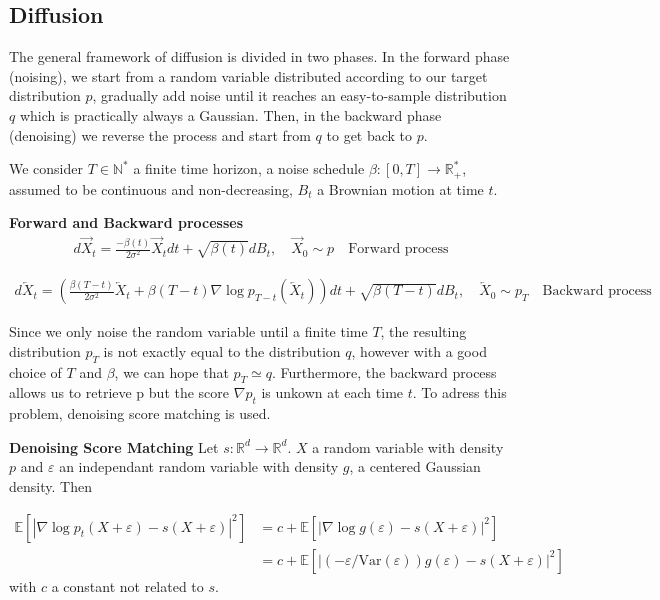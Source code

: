 \documentclass{article}
\begin{document}
\subsection{Diffusion}
The general framework of diffusion is divided in two phases. In the forward phase (noising), we start from a random variable distributed according to our target distribution \( p \), gradually add noise until it reaches an easy-to-sample distribution \(q\) which is practically always a Gaussian. Then, in the backward phase (denoising) we reverse the process and start from \(q\) to get back to \(p\). 

\bigskip

We consider \(T\in\mathbb{N}^{*}\) a finite time horizon, a noise schedule \(\beta:[0,T]\rightarrow \mathbb{R}_{+}^{*}\), assumed to be continuous and non-decreasing, \(B_t\) a Brownian motion at time \(t\).

\textbf{Forward and Backward processes}
\begin{align}
    d\overrightarrow{X}_t = \frac{-\beta(t)}{2\sigma^2}\overrightarrow{X}_t dt + \sqrt{\beta(t)}dB_t, \quad \overrightarrow{X}_0\sim p 
    \quad \text{Forward process}
\end{align} 

\begin{align}
    d\overleftarrow{X}_t=\left(  \frac{\beta(T-t)}{2\sigma^2}\overleftarrow{X}_t+\beta(T-t)\nabla\log p_{T-t}\left(\overleftarrow{X}_t \right)  \right)dt + \sqrt{\beta(T-t)}dB_t, \quad \overleftarrow{X}_0\sim p_T \quad \text{Backward process}
\end{align}

Since we only noise the random variable until a finite time \(T\), the resulting distribution \(p_T\) is not exactly equal to the distribution \(q\), however with a good choice of \(T\) and \(\beta\), we can hope that \(p_T\simeq q\). Furthermore, the backward process allows us to retrieve p but the score \(\nabla p_t\) is unkown at each time \(t\). To adress this problem, denoising score matching is used.  

\bigskip
\textbf{Denoising Score Matching} \newline
Let \(s:\mathbb{R}^d\rightarrow\mathbb{R}^d\). \(X\) a random variable with density \(p\) and \(\varepsilon\) an independant random variable with density \(g\), a centered Gaussian density. Then 

\begin{align}
    \mathbb{E}[|\nabla \log p_t (X+\varepsilon)-s(X+\varepsilon)|^2]&=c+\mathbb{E}[|\nabla \log g(\varepsilon)-s(X+\varepsilon)|^2]\\
    &=c+\mathbb{E}[|(-\varepsilon/\text{Var} (\varepsilon))g(\varepsilon)-s(X+\varepsilon)|^2]
\end{align}
with \(c\) a constant not related to \(s\).
\end{document}
